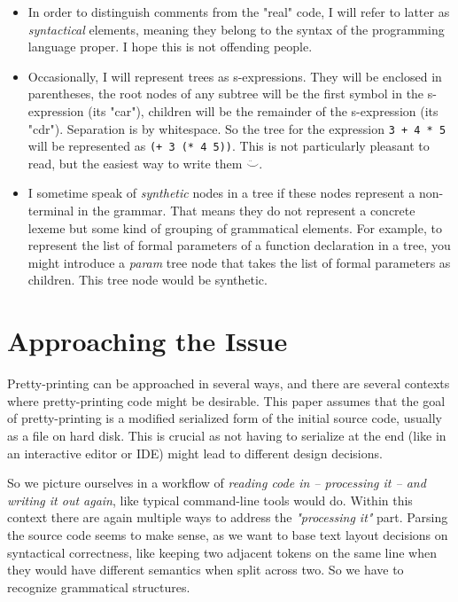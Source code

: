 \documentclass[11pt,a4paper]{article}
\begin{document}
\begin{itemize}
\item In order to distinguish comments from the "real" code, I
will refer to latter as \emph{syntactical} elements, meaning they belong to the
syntax of the programming language proper. I hope this is not offending people.

\item Occasionally, I will represent trees as s-expressions. They will be
enclosed in parentheses, the root nodes of any subtree will be the first symbol
in the s-expression (its "car"), children will be the remainder of the
s-expression (its "cdr"). Separation is by whitespace. So the tree for the
expression \texttt{3 + 4 * 5} will be represented as \texttt{(+ 3 (* 4 5))}.
This is not particularly pleasant to read, but the easiest way to write them
$\ddot\smile$.

\item I sometime speak of \emph{synthetic} nodes in a tree if these nodes
  represent a non-terminal in the grammar. That means they do not represent a
  concrete lexeme but some kind of grouping of grammatical elements. For example,
  to represent the list of formal parameters of a function declaration in a
  tree, you might introduce a \emph{param} tree node that takes the list of
  formal parameters as children. This tree node would be synthetic.

\end{itemize}


\section{Approaching the Issue}

Pretty-printing can be approached in several ways, and there are several
contexts where pretty-printing code might be desirable. This paper assumes that
the goal of pretty-printing is a modified serialized form of the initial source
code, usually as a file on hard disk. This is crucial as not having to serialize
at the end (like in an interactive editor or IDE) might lead to different design
decisions.

So we picture ourselves in a workflow of \emph{reading code in --
processing it -- and writing it out again}, like typical command-line tools
would do. Within this context there are again multiple ways to address the
\emph{"processing it"} part. Parsing the source code seems to make sense, as we
want to base text layout decisions on syntactical correctness, like keeping two
adjacent tokens on the same line when they would have different semantics when
split across two. So we have to recognize grammatical structures.
\end{document}
